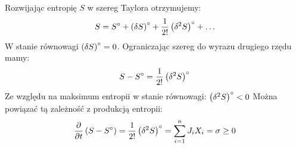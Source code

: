\documentclass[10pt, a4paper, twoside, onecolumn]{article}
\numberwithin{equation}{section}
\begin{document}
	Rozwijając entropię \(S\) w szereg Taylora otrzymujemy:
	\begin{equation}
		S = S^\circ + \left(\var{S}\right)^\circ + \frac{1}{2!}\left(\var^{2}S\right)^\circ + \ldots
	\end{equation}
	W stanie równowagi \(\left(\var{S}\right)^\circ=0\). Ograniczając szereg do wyrazu drugiego rzędu mamy:
	\begin{equation}
		S - S^\circ = \frac{1}{2!}\left(\var^{2}S\right)^\circ
	\end{equation}
	Ze względu na maksimum entropii w stanie równowagi: \(\left(\var^{2}S\right)^\circ<0\)
	Można powiązać tą zależność z produkcją entropii: 
	\begin{equation}
		\pdv{t}\left(S - S^\circ\right) = \frac{1}{2!}\left(\var^{2}S\right)^\circ = \sum_{i=1}^{n}J_{i}X_{i}=\sigma\geq0
	\end{equation}
\end{document}
